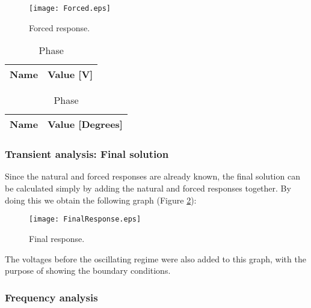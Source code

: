 \begin{figure}[H] \centering
    \texttt{[image: Forced.eps]}
    \caption{Forced response.}
    \label{fig:ForOC}
\end{figure}



\begin{table}[H]
    \caption{Phase and magnitude of the voltage on each node}
    \begin{subtable}{.5\linewidth}
      \centering
        \caption{Magnitude}
        \begin{tabular}{ll}
        \hline    
        {\bf Name} & {\bf Value [V]} \\ \hline
        
        \end{tabular}
        \label{tab:MagnitudeOc}
    \end{subtable}%
    \begin{subtable}{.5\linewidth}
      \centering
        \caption{Phase}
        \begin{tabular}{ll}
        \hline    
        {\bf Name} & {\bf Value [Degrees]} \\ \hline
        
        \end{tabular}
        \label{tab:PhaseOc}
    \end{subtable} 
\end{table}

    
\subsubsection{Transient analysis: Final solution}

\indent

Since the natural and forced responses are already known, the final solution can be calculated simply by adding the natural and forced responses together. By doing this we obtain the following graph (Figure \ref{fig:FinalOc}):


\begin{figure}[H] \centering
    \texttt{[image: FinalResponse.eps]}
    \caption{Final response.}
    \label{fig:FinalOc}
\end{figure}


The voltages before the oscillating regime were also added to this graph, with the purpose of showing the boundary conditions.

\subsubsection{Frequency analysis}


